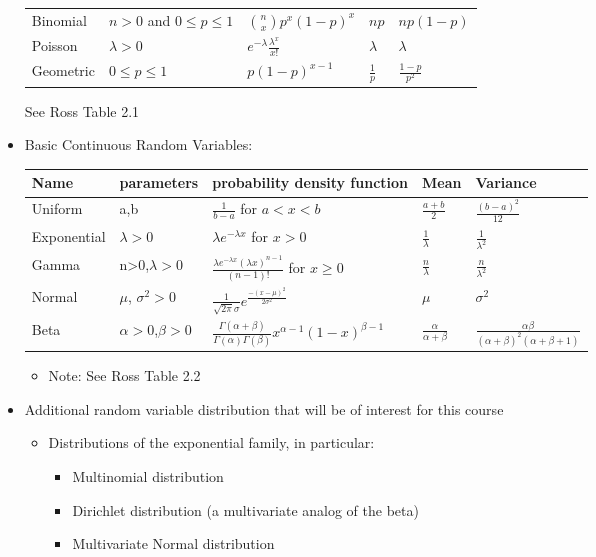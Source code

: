 \documentclass[12pt]{report}
\begin{document}
\begin{itemize}
\begin{center}
\begin{tabular}{lllll}
\hline
Binomial & $n>0$ and $0\leq p\leq 1$ & $\binom{n}{x} p^x (1-p)^x$ & $np$ & $np(1-p)$\\
Poisson & $\lambda >0$ & $e^{-\lambda}\frac{\lambda^x}{x!}$ & $\lambda$ & $\lambda$\\
Geometric & $0\leq p\leq 1$ & $p(1-p)^{x-1}$ & $\frac{1}{p}$ & $\frac{1-p}{p^2}$\\
\hline
\end{tabular}
\end{center}
See Ross Table 2.1
\item Basic Continuous Random Variables:
\label{sec-1-1-4-3}
\begin{center}
\begin{tabular}{lllll}
\hline
Name & parameters & probability density function & Mean & Variance\\
\hline
Uniform & a,b & $\frac{1}{b-a}$ for $a<x<b$ & $\frac{a+b}{2}$ & $\frac{(b-a)^2}{12}$\\
Exponential & $\lambda>0$ & $\lambda e^{-\lambda x}$ for $x>0$ & $\frac{1}{\lambda}$ & $\frac{1}{\lambda^2}$\\
Gamma & n>0,$\lambda>0$ & $\frac{\lambda e^{-\lambda x}(\lambda x)^{n-1}}{(n-1)!}$ for $x\geq 0$ & $\frac{n}{\lambda}$ & $\frac{n}{\lambda^2}$\\
Normal & $\mu$, $\sigma^2>0$ & $\frac{1}{\sqrt{2\pi}\sigma}e^{\frac{-(x-\mu)^2}{2\sigma^2}}$ & $\mu$ & $\sigma^2$\\
Beta & $\alpha>0$,$\beta>0$ & $\frac{\Gamma(\alpha+\beta)}{\Gamma(\alpha)\Gamma(\beta)}x^{\alpha-1}(1-x)^{\beta-1}$ & $\frac{\alpha}{\alpha+\beta}$ & $\frac{\alpha \beta}{(\alpha+\beta)^2 (\alpha+\beta+1)}$\\
\hline
\end{tabular}
\end{center}
\begin{itemize}
\item Note: See Ross Table 2.2
\end{itemize}
\item Additional random variable distribution that will be of interest for this course
\label{sec-1-1-4-4}
\begin{itemize}
\item Distributions of the exponential family, in particular:
\begin{itemize}
\item Multinomial distribution
\item Dirichlet distribution (a multivariate analog of the beta)
\item Multivariate Normal distribution

\end{itemize}
\end{itemize}
\end{itemize}
\end{document}
